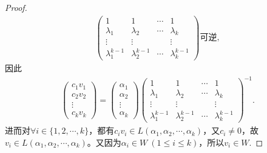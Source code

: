 \documentclass[../../main.tex]{subfiles}
\begin{document}
\begin{proof}
\begin{align*}
\begin{pmatrix}
1 & 1 & \cdots & 1 \\
\lambda_1 & \lambda_2 & \cdots & \lambda_k \\
\vdots & \vdots & & \vdots \\
\lambda_1^{k - 1} & \lambda_2^{k - 1} & \cdots & \lambda_k^{k - 1}
\end{pmatrix} \text{可逆},
\end{align*}
因此
\begin{align*}
\begin{pmatrix}
c_1v_1 \\
c_2v_2 \\
\vdots \\
c_kv_k
\end{pmatrix} = 
\begin{pmatrix}
\alpha_1 \\
\alpha_2 \\
\vdots \\
\alpha_k
\end{pmatrix} 
\begin{pmatrix}
1 & 1 & \cdots & 1 \\
\lambda_1 & \lambda_2 & \cdots & \lambda_k \\
\vdots & \vdots & & \vdots \\
\lambda_1^{k - 1} & \lambda_2^{k - 1} & \cdots & \lambda_k^{k - 1}
\end{pmatrix}^{-1}.
\end{align*}
进而对$\forall i\in \{1,2,\cdots,k\}$，都有$c_iv_i\in L(\alpha_1,\alpha_2,\cdots,\alpha_k)$，又$c_i\ne 0$，故$v_i\in L(\alpha_1,\alpha_2,\cdots,\alpha_k)$。又因为$\alpha_i\in W\ (1\le i\le k)$，所以$v_i\in W$.
\end{proof}
\end{document}
